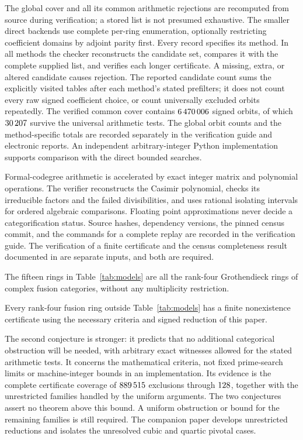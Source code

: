 The global cover and all its common arithmetic rejections are recomputed
from source during verification; a stored list is not presumed exhaustive.
The smaller direct backends use complete per-ring enumeration, optionally
restricting coefficient domains by adjoint parity first. Every record
specifies its method. In all methods the checker reconstructs the candidate
set, compares it with the complete supplied list, and verifies each longer
certificate. A missing, extra, or altered candidate causes rejection.
The reported candidate count sums the explicitly visited tables after
each method's stated prefilters; it does not count every raw signed
coefficient choice, or count universally excluded orbits repeatedly.
The verified common cover contains $6\,470\,006$ signed orbits,
of which $30\,207$ survive the universal arithmetic tests.
The global orbit counts and the method-specific totals are recorded
separately in the verification guide and electronic reports. An independent
arbitrary-integer Python implementation supports comparison with the
direct bounded searches.

Formal-codegree arithmetic is accelerated by exact integer matrix and
polynomial operations. The verifier reconstructs the Casimir polynomial,
checks its irreducible factors and the failed divisibilities, and uses
rational isolating intervals for ordered algebraic comparisons. Floating
point approximations never decide a categorification status. Source
hashes, dependency versions, the pinned census commit, and the commands
for a complete replay are recorded in the verification guide. The
verification of a finite certificate and the census completeness result
documented in \cite{Census} are separate inputs, and both are required.

\begin{conjecture}\label{conj:classification}
The fifteen rings in Table~\ref{tab:models} are all the rank-four
Grothendieck rings of complex fusion categories, without any multiplicity
restriction.
\end{conjecture}
\begin{conjecture}\label{conj:criteria}
Every rank-four fusion ring outside Table~\ref{tab:models} has a finite
nonexistence certificate using the necessary criteria and signed reduction
of this paper.
\end{conjecture}
The second conjecture is stronger: it predicts that no additional
categorical obstruction will be needed, with arbitrary exact witnesses
allowed for the stated arithmetic tests. It concerns the mathematical
criteria, not fixed prime-search limits or machine-integer bounds in an
implementation. Its evidence is the complete certificate coverage of
$889\,515$ exclusions through $128$, together with
the unrestricted families handled by the uniform arguments. The two
conjectures assert no theorem above this bound. A uniform obstruction or
bound for the remaining families is still required. The companion paper
develops unrestricted reductions and isolates the unresolved cubic and
quartic pivotal cases.

